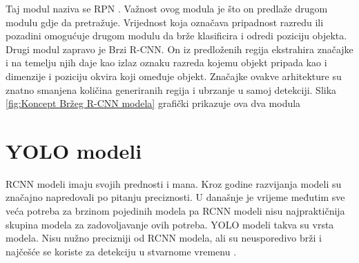 Taj modul naziva se RPN . Važnost ovog modula je što on predlaže drugom modulu gdje da pretražuje. Vrijednost koja označava pripadnost razredu ili pozadini 
omogućuje drugom modulu da brže klasificira i odredi poziciju objekta. 
Drugi modul zapravo je Brzi R-CNN. On iz predloženih regija ekstrahira značajke i na temelju njih daje kao izlaz oznaku razreda kojemu objekt pripada kao i dimenzije i poziciju okvira koji
omeđuje objekt.\newline
Značajke ovakve arhitekture su znatno smanjena količina generiranih regija i ubrzanje u samoj detekciji. Slika \ref{fig:Koncept Bržeg R-CNN modela} grafički prikazuje
ova dva modula \citep{DBLP:journals/corr/RenHG015}


\section{YOLO modeli}
RCNN modeli imaju svojih prednosti i mana. Kroz godine razvijanja modeli su značajno napredovali po pitanju preciznosti. 
U današnje je vrijeme međutim sve veća potreba za brzinom 
pojedinih modela pa RCNN modeli nisu najpraktičnija skupina modela za zadovoljavanje ovih potreba.\newline
YOLO  modeli takva su vrsta modela. Nisu nužno precizniji od RCNN modela, ali su neusporedivo
brži i najčešće se koriste za detekciju u stvarnome vremenu . 



